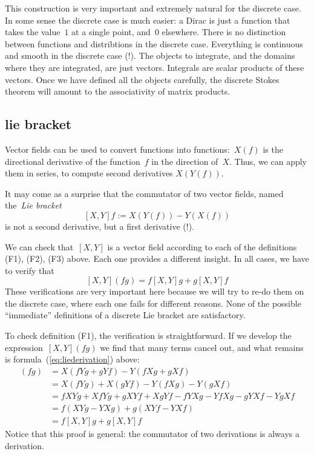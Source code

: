 This construction is very important and extremely natural for the discrete case.
In some sense the discrete case is much easier: a Dirac is just a function
that takes the value~$1$ at a single point, and~$0$ elsewhere.  There is no
distinction between functions and distribtions in the discrete case.
Everything is continuous and smooth in the discrete case (!).
The objects to integrate, and the domains where they are integrated, are just
vectors.
Integrals are
scalar products of these vectors.   Once we have
defined all the objects carefully, the discrete Stokes theorem will amount to
the associativity of matrix products.

\subsection{lie bracket}

Vector fields can be used to convert functions into functions:~$X(f)$ is the
directional derivative of the function~$f$ in the direction of~$X$.
Thus, we can apply them in series, to compute second derivatives $X(Y(f))$.

It may come as a surprise that the commutator of two vector fields,
named the~\emph{Lie bracket}
\[
	[X,Y]f := X(Y(f)) - Y(X(f))
\]
is not a second derivative, but a first derivative (!).

We can check that~$[X,Y]$ is a vector field according to each of the
definitions (F1), (F2), (F3) above.  Each one provides a different insight.
In all cases, we have to verify that
\begin{equation}\label{eq:liederivation}
	[X,Y](fg) = f[X,Y]g + g[X,Y]f
\end{equation}
These verifications are very important here because we will try to re-do them
on the discrete case, where each one fails for different reasons.  None of the
possible ``immediate'' definitions of a discrete Lie bracket are
satisfactory.

To check definition (F1), the verification is straightforward. If we develop the
expression~$[X,Y](fg)$ we find that many terms cancel out, and what remains
is formula~(\ref{eq:liederivation}) above:
\begin{align*}
	[X,Y]\left(fg\right) &= X\left(fYg+gYf\right)-Y\left(fXg+gXf\right) \\
	&= X\left(fYg\right)+X\left(gYf\right)-Y\left(fXg\right)-Y\left(gXf\right) \\
	&= fXYg + XfYg + gXYf + XgYf - fYXg - YfXg - gYXf - YgXf\\
	&= f(XYg-YXg) + g(XYf-YXf) \\
	&= f[X,Y]g + g[X,Y]f
\end{align*}
Notice that this proof is general: the commutator of two
derivations is always a derivation.


